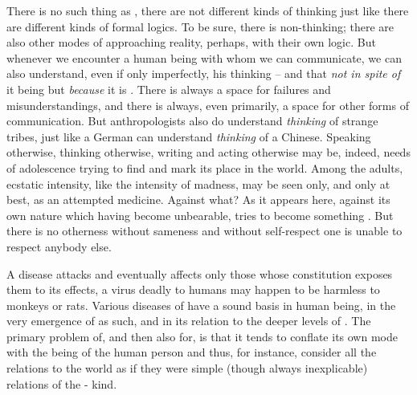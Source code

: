 There is no such thing as , there are not different
kinds of thinking just like there are different kinds of formal logics.  To be
sure, there is non-thinking; there are also other modes of approaching reality,
perhaps, with their own logic. But whenever we encounter a human being with whom
we can communicate, we can also understand, even if only imperfectly, his
thinking -- and that {\em not in spite of} it being  but {\em because}
it is . There is always a space for failures and
misunderstandings, and there is always, even primarily, a space for other forms
of communication. But anthropologists also do understand {\em thinking} of
strange tribes, just like a German can understand {\em thinking} of a
Chinese.
Speaking otherwise, thinking otherwise, writing and acting otherwise may be,
indeed,  needs of adolescence trying to find and mark its place in
the world.  Among the adults, ecstatic intensity, like the intensity of madness,
may be seen only, and only at best, as an attempted medicine. Against what? As
it appears here, against its own nature which having become unbearable, tries to
become something . But there is no otherness without sameness and
without self-respect one is unable to respect anybody else.


\label{objectivisticillusion}

\pan A disease attacks and eventually affects only those whose constitution
exposes them to its effects, a virus deadly to humans may happen to be harmless
to monkeys or rats.  Various diseases of  have a sound basis in
human being, in the very emergence of  as such, and in its
relation to the deeper levels of .
The primary problem of, and then also for,
 is that it tends to conflate its own mode with the being
of the human person and thus, for instance, consider all the relations to
the world as if they were simple (though  always inexplicable)
relations of the - kind.


